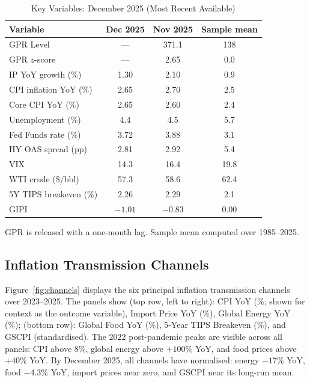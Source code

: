 \documentclass[12pt]{article}
\begin{document}
\begin{table}[htbp]\begin{center}
\caption{Key Variables: December 2025 (Most Recent Available)}
\label{tab:desc}
\begin{threeparttable}\small
\begin{tabular}{lccc}
\toprule
Variable & Dec 2025 & Nov 2025 & Sample mean\\
\midrule
GPR Level & ---\tnote{a} & 371.1 & 138\\
GPR $z$-score & --- & 2.65 & 0.0\\
IP YoY growth (\%) & 1.30 & 2.10 & 0.9\\
CPI inflation YoY (\%) & 2.65 & 2.70 & 2.5\\
Core CPI YoY (\%) & 2.65 & 2.60 & 2.4\\
Unemployment (\%) & 4.4 & 4.5 & 5.7\\
Fed Funds rate (\%) & 3.72 & 3.88 & 3.1\\
HY OAS spread (pp) & 2.81 & 2.92 & 5.4\\
VIX & 14.3 & 16.4 & 19.8\\
WTI crude (\$/bbl) & 57.3 & 58.6 & 62.4\\
5Y TIPS breakeven (\%) & 2.26 & 2.29 & 2.1\\
GIPI & $-1.01$ & $-0.83$ & 0.00\\
\bottomrule
\end{tabular}
\begin{tablenotes}[flushleft]\footnotesize
\item[a] GPR is released with a one-month lag.
Sample mean computed over 1985--2025.
\end{tablenotes}
\end{threeparttable}
\end{center}\end{table}

\subsection{Inflation Transmission Channels}

Figure~\ref{fig:channels} displays the six principal inflation transmission
channels over 2023--2025.
The panels show (top row, left to right): CPI YoY (\%; shown for context as the outcome variable), Import Price YoY (\%),
Global Energy YoY (\%); (bottom row): Global Food YoY (\%), 5-Year TIPS Breakeven (\%), and GSCPI (standardised).
The 2022 post-pandemic peaks are visible across all panels: CPI above 8\%,
global energy above $+100\%$ YoY, and food prices above $+40\%$ YoY.
By December 2025, all channels have normalised: energy $-17\%$ YoY,
food $-4.3\%$ YoY, import prices near zero, and GSCPI near its
long-run mean.
\end{document}
